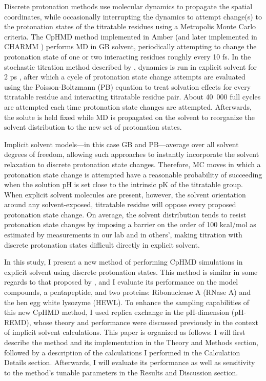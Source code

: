 Discrete protonation methods use molecular dynamics to propagate the spatial
coordinates, while occasionally interrupting the dynamics to attempt change(s)
to the protonation states of the titratable residues using a Metropolis Monte
Carlo criteria. The CpHMD method implemented in Amber
\cite{Mongan_JComputChem_2004_v25_p2038} (and later implemented in CHARMM
\cite{Itoh_Proteins_2011_v79_p3420}) performs MD in GB solvent, periodically
attempting to change the protonation state of one or two interacting residues
roughly every 10 fs. \cite{Mongan_JComputChem_2004_v25_p2038} In the stochastic
titration method described by \citeauthor{Baptista_JChemPhys_2002_v117_p4184},
dynamics is run in explicit solvent for 2 ps
\cite{Machuqueiro_Proteins_2008_v72_p289}, after which a cycle of protonation
state change attempts are evaluated using the Poisson-Boltzmann (PB) equation to
treat solvation effects for every titratable residue and interacting titratable
residue pair.  About \mbox{40 000} full cycles are attempted each time
protonation state changes are attempted.
\cite{Baptista_JPhysChemB_2001_v105_p293} Afterwards, the solute is held fixed
while MD is propagated on the solvent to reorganize the solvent distribution to
the new set of protonation states.

Implicit solvent models---in this case GB and PB---average over all solvent
degrees of freedom, allowing such approaches to instantly incorporate the
solvent relaxation to discrete protonation state changes. Therefore, MC moves in
which a protonation state change is attempted have a reasonable probability of
succeeding when the solution pH is set close to the intrinsic pK of the
titratable group. When explicit solvent molecules are present, however, the
solvent orientation around any solvent-exposed, titratable residue will oppose
every proposed protonation state change. On average, the solvent distribution
tends to resist protonation state changes by imposing a barrier on the order of
100 kcal/mol as estimated by measurements in our lab and in others',
\cite{Wallace_JChemTheoryComput_2011_v7_p2617} making titration with discrete
protonation states difficult directly in explicit solvent.

In this study, I present a new method of performing CpHMD simulations in
explicit solvent using discrete protonation states.  This method is similar 
in some regards to that proposed by
\citeauthor{Baptista_JChemPhys_2002_v117_p4184},
\cite{Baptista_JChemPhys_2002_v117_p4184} and I evaluate its performance on
the model compounds, a pentapeptide, and two proteins: Ribonuclease A (RNase A)
and the hen egg white lysozyme (HEWL). To enhance the sampling capabilities of
this new CpHMD method, I used replica exchange in the pH-dimension (pH-REMD),
whose theory and performance were discussed previously in the context of
implicit solvent calculations.  \cite{Itoh_Proteins_2011_v79_p3420,
Swails_JChemTheoryComput_2012_v8_p4393} This paper is organized as follows: I
will first describe the method and its implementation in the Theory and Methods
section, followed by a description of the calculations I performed in the
Calculation Details section. Afterwards, I will evaluate its performance as
well as sensitivity to the method's tunable parameters in the Results and
Discussion section.

